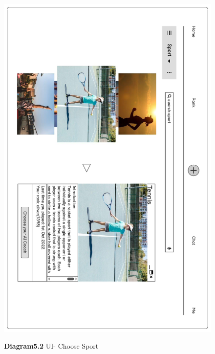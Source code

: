 \documentclass[a4paper]{article}
\begin{document}
	\begin{figure}[H]
		\centering
		\caption*{\textbf{Diagram5.2} UI- Choose Sport}
		\includegraphics[width=1\textwidth]{images/UI_Final/UI_Final_2.pdf}
		\label{UI_2}
	\end{figure}
\end{document}
